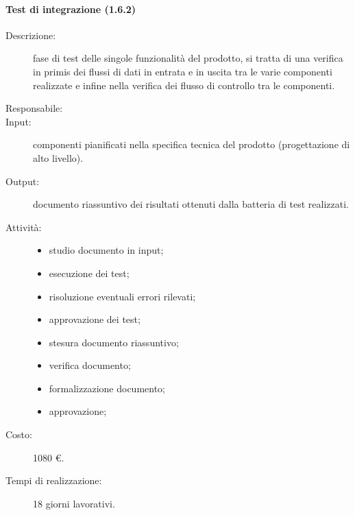 \paragraph{Test di integrazione (1.6.2)}
\begin{description}
\item[Descrizione:] fase di test delle singole funzionalità del prodotto, si tratta di una verifica in primis dei flussi di dati in entrata e in uscita tra le varie componenti realizzate e infine nella verifica dei flusso di controllo tra le componenti.
\item[Responsabile:] 
\item[Input:] componenti pianificati nella specifica tecnica del prodotto (progettazione di alto livello).
\item[Output:] documento riassuntivo dei risultati ottenuti dalla batteria di test realizzati.
\item[Attività:] 
\begin{center}
\begin{itemize}
\item studio documento in input;
\item esecuzione dei test;
\item risoluzione eventuali errori rilevati;
\item approvazione dei test;
\item stesura documento riassuntivo;
\item verifica documento;
\item formalizzazione documento;
\item approvazione;
\end{itemize}
\end{center}
\item[Costo:] 1080 \euro{}.
\item[Tempi di realizzazione:] 18 giorni lavorativi.
\end{description}

